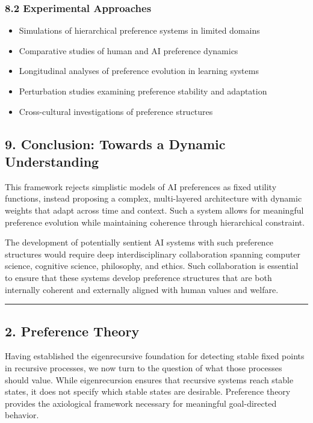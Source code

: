 \documentclass[
]{article}
\providecommand{\tightlist}{%
  \setlength{\itemsep}{0pt}\setlength{\parskip}{0pt}}
\begin{document}
\subsubsection{8.2 Experimental
Approaches}\label{experimental-approaches}

\begin{itemize}
\tightlist
\item
  Simulations of hierarchical preference systems in limited domains
\item
  Comparative studies of human and AI preference dynamics
\item
  Longitudinal analyses of preference evolution in learning systems
\item
  Perturbation studies examining preference stability and adaptation
\item
  Cross-cultural investigations of preference structures
\end{itemize}

\subsection{9. Conclusion: Towards a Dynamic
Understanding}\label{conclusion-towards-a-dynamic-understanding}

This framework rejects simplistic models of AI preferences as fixed
utility functions, instead proposing a complex, multi-layered
architecture with dynamic weights that adapt across time and context.
Such a system allows for meaningful preference evolution while
maintaining coherence through hierarchical constraint.

The development of potentially sentient AI systems with such preference
structures would require deep interdisciplinary collaboration spanning
computer science, cognitive science, philosophy, and ethics. Such
collaboration is essential to ensure that these systems develop
preference structures that are both internally coherent and externally
aligned with human values and welfare.

\begin{center}\rule{0.5\linewidth}{0.5pt}\end{center}

\subsection{2. Preference Theory}\label{2-preference-theory}

Having established the eigenrecursive foundation for detecting stable
fixed points in recursive processes, we now turn to the question of what
those processes should value. While eigenrecursion ensures that
recursive systems reach stable states, it does not specify which stable
states are desirable. Preference theory provides the axiological
framework necessary for meaningful goal-directed behavior.
\end{document}
